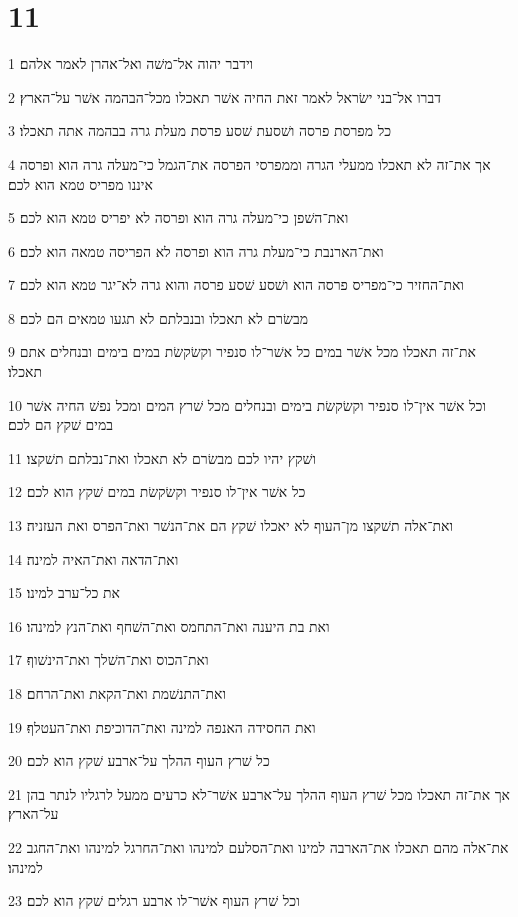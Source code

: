 \chapter{11}

\par 1 וידבר יהוה אל־משׁה ואל־אהרן לאמר אלהם׃
\par 2 דברו אל־בני ישׂראל לאמר זאת החיה אשׁר תאכלו מכל־הבהמה אשׁר על־הארץ׃
\par 3 כל מפרסת פרסה ושׁסעת שׁסע פרסת מעלת גרה בבהמה אתה תאכלו׃
\par 4 אך את־זה לא תאכלו ממעלי הגרה וממפרסי הפרסה את־הגמל כי־מעלה גרה הוא ופרסה איננו מפריס טמא הוא לכם׃
\par 5 ואת־השׁפן כי־מעלה גרה הוא ופרסה לא יפריס טמא הוא לכם׃
\par 6 ואת־הארנבת כי־מעלת גרה הוא ופרסה לא הפריסה טמאה הוא לכם׃
\par 7 ואת־החזיר כי־מפריס פרסה הוא ושׁסע שׁסע פרסה והוא גרה לא־יגר טמא הוא לכם׃
\par 8 מבשׂרם לא תאכלו ובנבלתם לא תגעו טמאים הם לכם׃
\par 9 את־זה תאכלו מכל אשׁר במים כל אשׁר־לו סנפיר וקשׂקשׂת במים בימים ובנחלים אתם תאכלו׃
\par 10 וכל אשׁר אין־לו סנפיר וקשׂקשׂת בימים ובנחלים מכל שׁרץ המים ומכל נפשׁ החיה אשׁר במים שׁקץ הם לכם׃
\par 11 ושׁקץ יהיו לכם מבשׂרם לא תאכלו ואת־נבלתם תשׁקצו׃
\par 12 כל אשׁר אין־לו סנפיר וקשׂקשׂת במים שׁקץ הוא לכם׃
\par 13 ואת־אלה תשׁקצו מן־העוף לא יאכלו שׁקץ הם את־הנשׁר ואת־הפרס ואת העזניה׃
\par 14 ואת־הדאה ואת־האיה למינה׃
\par 15 את כל־ערב למינו׃
\par 16 ואת בת היענה ואת־התחמס ואת־השׁחף ואת־הנץ למינהו׃
\par 17 ואת־הכוס ואת־השׁלך ואת־הינשׁוף׃
\par 18 ואת־התנשׁמת ואת־הקאת ואת־הרחם׃
\par 19 ואת החסידה האנפה למינה ואת־הדוכיפת ואת־העטלף׃
\par 20 כל שׁרץ העוף ההלך על־ארבע שׁקץ הוא לכם׃
\par 21 אך את־זה תאכלו מכל שׁרץ העוף ההלך על־ארבע אשׁר־לא כרעים ממעל לרגליו לנתר בהן על־הארץ׃
\par 22 את־אלה מהם תאכלו את־הארבה למינו ואת־הסלעם למינהו ואת־החרגל למינהו ואת־החגב למינהו׃
\par 23 וכל שׁרץ העוף אשׁר־לו ארבע רגלים שׁקץ הוא לכם׃
